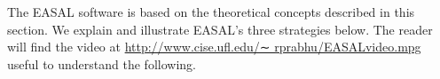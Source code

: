 
The EASAL software is based on the theoretical concepts described in this section. 
We explain and illustrate EASAL's three strategies below. The reader will find
the video at \url{http://www.cise.ufl.edu/∼ rprabhu/EASALvideo.mpg} useful to understand the following. 




